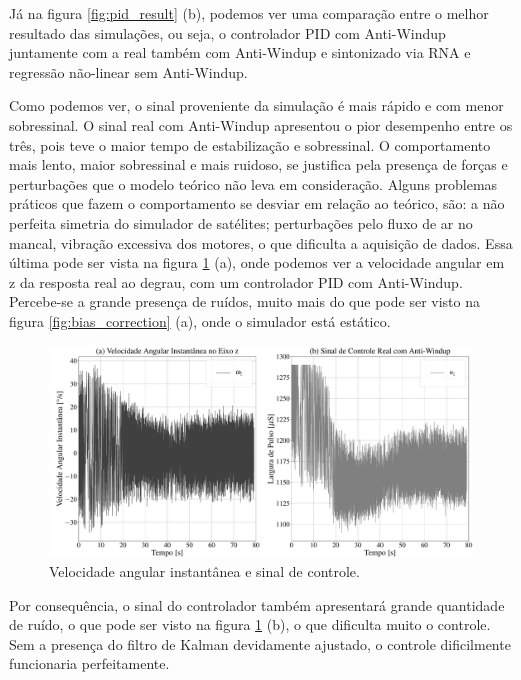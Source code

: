 Já na figura \ref{fig:pid_result} (b), podemos ver uma comparação entre o melhor resultado das simulações, ou seja, o controlador PID com Anti-Windup juntamente com a real também com Anti-Windup e sintonizado via RNA e regressão não-linear sem Anti-Windup.

Como podemos ver, o sinal proveniente da simulação é mais rápido e com menor sobressinal. O sinal real com Anti-Windup apresentou o pior desempenho entre os três, pois teve o maior tempo de estabilização e sobressinal. O comportamento mais lento, maior sobressinal e mais ruidoso, se justifica pela presença de forças e perturbações que o modelo teórico não leva em consideração. Alguns problemas práticos que fazem o comportamento se desviar em relação ao teórico, são: a não perfeita simetria do simulador de satélites; perturbações pelo fluxo de ar no mancal, vibração excessiva dos motores, o que dificulta a aquisição de dados. Essa última pode ser vista na figura \ref{fig:pid_result_controlller} (a), onde podemos ver a velocidade angular em z da resposta real ao degrau, com um controlador PID com Anti-Windup. Percebe-se a grande presença de ruídos, muito mais do que pode ser visto na figura \ref{fig:bias_correction} (a), onde o simulador está estático.

\begin{figure}[H]
  \caption{Velocidade angular instantânea e sinal de controle.}
  \begin{center}
      \includegraphics[scale=0.25]{resultados/img/pid_result_controller}
  \end{center}
  \label{fig:pid_result_controlller}
\end{figure}

Por consequência, o sinal do controlador também apresentará grande quantidade de ruído, o que pode ser visto na figura \ref{fig:pid_result_controlller} (b), o que dificulta muito o controle. Sem a presença do filtro de Kalman devidamente ajustado, o controle dificilmente funcionaria perfeitamente.
